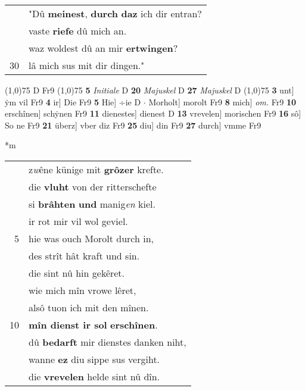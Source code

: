 \documentclass[8pt,a4paper,notitlepage]{article}
\begin{document}
\begin{table}[ht]
\begin{minipage}[t]{0.5\linewidth}
\begin{tabular}{rl}
 & "Dû \textbf{meinest}, \textbf{durch} \textbf{daz} ich dir entran?\\ 
 & vaste \textbf{riefe} dû mich an.\\ 
 & waz woldest dû an mir \textbf{ertwingen}?\\ 
30 & lâ mich sus mit dir dingen."\\ 
\end{tabular}
\scriptsize
\line(1,0){75} \newline
D Fr9 \newline
\line(1,0){75} \newline
\textbf{5} \textit{Initiale} D  \textbf{20} \textit{Majuskel} D  \textbf{27} \textit{Majuskel} D  \newline
\line(1,0){75} \newline
\textbf{3} unt] ẏm vil Fr9 \textbf{4} ir] Die Fr9 \textbf{5} Hie] ÷ie D  $\cdot$ Morholt] morolt Fr9 \textbf{8} mich] \textit{om.} Fr9 \textbf{10} erschînen] schẏnen Fr9 \textbf{11} dienestes] dienest D \textbf{13} vrevelen] morischen Fr9 \textbf{16} sô] So ne Fr9 \textbf{21} überz] vber diz Fr9 \textbf{25} diu] din Fr9 \textbf{27} durch] vmme Fr9 \newline
\end{minipage}
\hspace{0.5cm}
\begin{minipage}[t]{0.5\linewidth}
\small
\begin{center}*m
\end{center}
\begin{tabular}{rl}
 & z\textit{w}êne künige mit \textbf{grôzer} krefte.\\ 
 & die \textbf{vluht} von der ritterschefte\\ 
 & si \textbf{brâhten} \textbf{und} manig\textit{en} kiel.\\ 
 & ir rot mir vil wol geviel.\\ 
5 & hie was ouch Morolt durch in,\\ 
 & des strît hât kraft und sin.\\ 
 & die sint nû hin gekêret.\\ 
 & wie mich mîn vrowe lêret,\\ 
 & alsô tuon ich mit den mînen.\\ 
10 & \textbf{mîn dienst ir sol} \textbf{erschînen}.\\ 
 & dû \textbf{bedarft} mir dienstes danken niht,\\ 
 & wanne \textbf{ez} diu sippe sus vergiht.\\ 
 & die \textbf{vrevelen} helde sint nû dîn.\\ 

\end{tabular}
\end{minipage}
\end{table}
\end{document}
